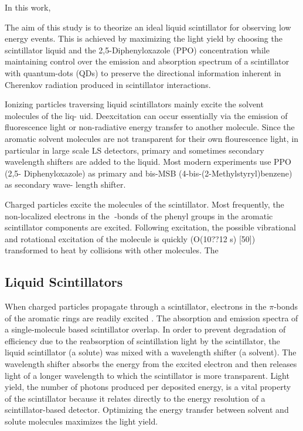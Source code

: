 \documentclass{JINST}
\begin{document}
In this work, 


 The aim of this study is to theorize an ideal liquid scintillator for observing low energy events. This is achieved by maximizing the light yield by choosing the scintillator liquid and the 2,5-Diphenyloxazole (PPO) concentration while maintaining control over the emission and absorption spectrum of a scintillator with quantum-dots (QDs) to preserve the directional information inherent in Cherenkov radiation produced in scintillator interactions.

Ionizing  particles  traversing  liquid  scintillators  mainly  excite  the  solvent  molecules  of  the  liq-
uid.   Deexcitation  can  occur  essentially  via  the  emission  of  fluorescence  light  or  non-radiative
energy  transfer  to  another  molecule.   Since  the  aromatic  solvent  molecules  are  not  transparent
for their own flourescence light, in particular in large scale LS detectors, primary and sometimes
secondary wavelength shifters are added to the liquid.  Most modern experiments use PPO (2,5-
Diphenyloxazole) as primary and bis-MSB (4-bis-(2-Methylstyryl)benzene) as secondary wave-
length shifter.

Charged particles excite
the molecules of the scintillator. Most frequently, the non-localized electrons in the
-bonds of the phenyl groups in the aromatic scintillator components are excited. Following
excitation, the possible vibrational and rotational excitation of the molecule is
quickly (O(10??12 s) [50]) transformed to heat by collisions with other molecules. The
\subsection{Liquid Scintillators}

When charged particles propagate through a scintillator, electrons in the $\pi$-bonds of the aromatic rings are readily excited \cite{birks64}. The absorption and emission spectra of a single-molecule based scintillator overlap. In order to prevent degradation of efficiency due to the reabsorption of scintillation light by the scintillator, the liquid scintillator (a solute) was mixed with a wavelength shifter (a solvent). The wavelength shifter absorbs the energy from the excited electron and then releases light of a longer wavelength to which the scintillator is more transparent. Light yield, the number of photons produced per deposited energy, is a vital property of the scintillator because it relates directly to the energy resolution of a scintillator-based detector. Optimizing the energy transfer between solvent and solute molecules maximizes the light yield.
\end{document}
